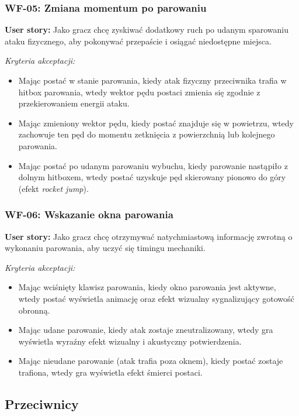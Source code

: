 \subsubsection*{WF-05: Zmiana momentum po parowaniu}
\textbf{User story:} Jako gracz chcę zyskiwać dodatkowy ruch po udanym sparowaniu ataku fizycznego, aby pokonywać przepaście i osiągać niedostępne miejsca.

\textit{Kryteria akceptacji:}
\begin{itemize}[noitemsep]
    \item Mając postać w stanie parowania, kiedy atak fizyczny przeciwnika trafia w hitbox parowania, wtedy wektor pędu postaci zmienia się zgodnie z przekierowaniem energii ataku.
    \item Mając zmieniony wektor pędu, kiedy postać znajduje się w powietrzu, wtedy zachowuje ten pęd do momentu zetknięcia z powierzchnią lub kolejnego parowania.
    \item Mając postać po udanym parowaniu wybuchu, kiedy parowanie nastąpiło z dolnym hitboxem, wtedy postać uzyskuje pęd skierowany pionowo do góry (efekt \textit{rocket jump}).
\end{itemize}

\subsubsection*{WF-06: Wskazanie okna parowania}
\textbf{User story:} Jako gracz chcę otrzymywać natychmiastową informację zwrotną o wykonaniu parowania, aby uczyć się timingu mechaniki.

\textit{Kryteria akceptacji:}
\begin{itemize}[noitemsep]
    \item Mając wciśnięty klawisz parowania, kiedy okno parowania jest aktywne, wtedy postać wyświetla animację oraz efekt wizualny sygnalizujący gotowość obronną.
    \item Mając udane parowanie, kiedy atak zostaje zneutralizowany, wtedy gra wyświetla wyraźny efekt wizualny i akustyczny potwierdzenia.
    \item Mając nieudane parowanie (atak trafia poza oknem), kiedy postać zostaje trafiona, wtedy gra wyświetla efekt śmierci postaci.
\end{itemize}

\subsection{Przeciwnicy}

